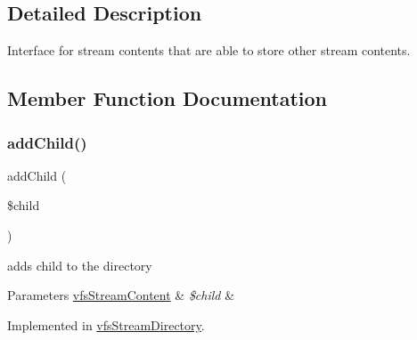 \subsection{Detailed Description}
Interface for stream contents that are able to store other stream contents. 

\subsection{Member Function Documentation}
\mbox{\label{interfaceorg_1_1bovigo_1_1vfs_1_1vfs_stream_container_ac6a77daa135cad7077e15b1de57e0d90}} 
\subsubsection{\texorpdfstring{add\+Child()}{addChild()}}
{\footnotesize\ttfamily add\+Child (\begin{DoxyParamCaption}\item[{\mbox{\hyperlink{interfaceorg_1_1bovigo_1_1vfs_1_1vfs_stream_content}{vfs\+Stream\+Content}}}]{\$child }\end{DoxyParamCaption})}

adds child to the directory


\begin{DoxyParams}[1]{Parameters}
\mbox{\hyperlink{interfaceorg_1_1bovigo_1_1vfs_1_1vfs_stream_content}{vfs\+Stream\+Content}} & {\em \$child} & \\
\hline
\end{DoxyParams}


Implemented in \mbox{\hyperlink{classorg_1_1bovigo_1_1vfs_1_1vfs_stream_directory_ac6a77daa135cad7077e15b1de57e0d90}{vfs\+Stream\+Directory}}.

\mbox{\label{interfaceorg_1_1bovigo_1_1vfs_1_1vfs_stream_container_a1cfdba129d25b04b73af8290f58ba7c1}} 
